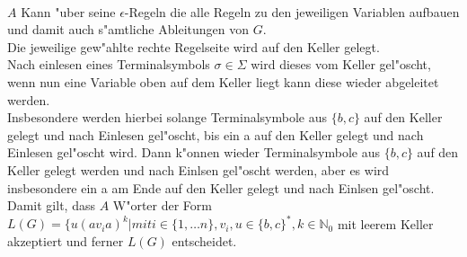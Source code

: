 \documentclass{article}
\newcommand{\eps}{\epsilon}
\begin{document}
\\
$A$ Kann "uber seine $\eps$-Regeln die alle Regeln zu den jeweiligen Variablen
    aufbauen und damit auch s"amtliche Ableitungen von $G$.\\
Die jeweilige gew"ahlte rechte Regelseite wird auf den Keller gelegt.\\
Nach einlesen eines Terminalsymbols $\sigma \in \Sigma$ wird dieses vom Keller
    gel"oscht, wenn nun eine Variable oben auf dem Keller liegt kann diese
    wieder abgeleitet werden.\\
Insbesondere werden hierbei solange Terminalsymbole aus $\{b,c\}$ auf den Keller
    gelegt und nach Einlesen gel"oscht, bis ein a auf den Keller gelegt und 
    nach Einlesen gel"oscht wird. Dann k"onnen
    wieder Terminalsymbole aus $\{b,c\}$ auf den Keller gelegt werden und 
    nach Einlsen gel"oscht werden, aber es wird insbesondere ein a am Ende auf 
    den Keller gelegt und nach Einlsen gel"oscht. Damit gilt, dass 
    $A$ W"orter der Form $
    L(G) = \{u(av_ia)^k
        | mit i \in \{1,\ldots n\}, v_i, u \in \{b,c\}^*, k \in \mathbb{N}_0
    $ mit leerem Keller akzeptiert und ferner $L(G)$ entscheidet.\\
\\
    
\end{document}
